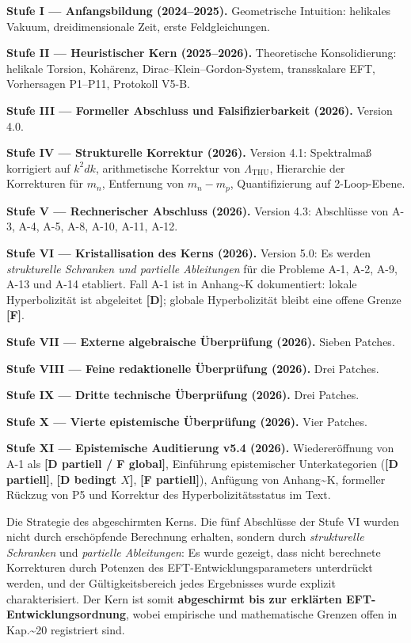 ﻿\documentclass[11pt,letterpaper]{article}
\begin{document}
\textbf{Stufe I --- Anfangsbildung (2024--2025).} Geometrische Intuition: helikales Vakuum, dreidimensionale Zeit, erste Feldgleichungen.

\textbf{Stufe II --- Heuristischer Kern (2025--2026).} Theoretische Konsolidierung: helikale Torsion, Kohärenz, Dirac--Klein--Gordon-System, transskalare EFT, Vorhersagen P1--P11, Protokoll V5-B.

\textbf{Stufe III --- Formeller Abschluss und Falsifizierbarkeit (2026).} Version 4.0.

\textbf{Stufe IV --- Strukturelle Korrektur (2026).} Version 4.1: Spektralmaß korrigiert auf $k^2 dk$, arithmetische Korrektur von $\Lambda_{\mathrm{THU}}$, Hierarchie der Korrekturen für $m_n$, Entfernung von $m_n - m_p$, Quantifizierung auf 2-Loop-Ebene.

\textbf{Stufe V --- Rechnerischer Abschluss (2026).} Version 4.3: Abschlüsse von A-3, A-4, A-5, A-8, A-10, A-11, A-12.

\textbf{Stufe VI --- Kristallisation des Kerns (2026).} Version 5.0: Es werden \emph{strukturelle Schranken und partielle Ableitungen} für die Probleme A-1, A-2, A-9, A-13 und A-14 etabliert. Fall A-1 ist in Anhang\textasciitilde{}K dokumentiert: lokale Hyperbolizität ist abgeleitet \textbf{[D]}; globale Hyperbolizität bleibt eine offene Grenze \textbf{[F]}.

\textbf{Stufe VII --- Externe algebraische Überprüfung (2026).} Sieben Patches.

\textbf{Stufe VIII --- Feine redaktionelle Überprüfung (2026).} Drei Patches.

\textbf{Stufe IX --- Dritte technische Überprüfung (2026).} Drei Patches.

\textbf{Stufe X --- Vierte epistemische Überprüfung (2026).} Vier Patches.

\textbf{Stufe XI --- Epistemische Auditierung v5.4 (2026).} Wiedereröffnung von A-1 als \textbf{[D partiell / F global]}, Einführung epistemischer Unterkategorien (\textbf{[D partiell]}, \textbf{[D bedingt $X$]}, \textbf{[F partiell]}), Anfügung von Anhang\textasciitilde{}K, formeller Rückzug von P5 und Korrektur des Hyperbolizitätsstatus im Text.

Die Strategie des abgeschirmten Kerns. Die fünf Abschlüsse der Stufe VI wurden nicht durch erschöpfende Berechnung erhalten, sondern durch \emph{strukturelle Schranken} und \emph{partielle Ableitungen}: Es wurde gezeigt, dass nicht berechnete Korrekturen durch Potenzen des EFT-Entwicklungsparameters unterdrückt werden, und der Gültigkeitsbereich jedes Ergebnisses wurde explizit charakterisiert. Der Kern ist somit \textbf{abgeschirmt bis zur erklärten EFT-Entwicklungsordnung}, wobei empirische und mathematische Grenzen offen in Kap.\textasciitilde{}20 registriert sind.
\end{document}
